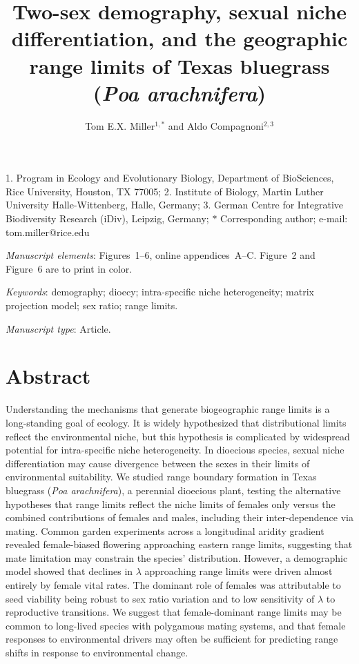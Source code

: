 \documentclass[11pt]{article}\usepackage[]{graphicx}\usepackage[]{color}
\title{Two-sex demography, sexual niche differentiation, and the geographic range limits of Texas bluegrass (\textit{Poa arachnifera})}
\author{Tom E.X. Miller$^{1,\ast}$ and Aldo Compagnoni$^{2,3}$}
\date{}
\begin{document}
\maketitle
\noindent{} 1. Program in Ecology and Evolutionary Biology, Department of BioSciences, Rice University, Houston, TX 77005;
\noindent{} 2. Institute of Biology, Martin Luther University Halle-Wittenberg, Halle, Germany;
\noindent{} 3. German Centre for Integrative Biodiversity Research (iDiv), Leipzig, Germany;
\noindent{} $\ast$ Corresponding author; e-mail: tom.miller@rice.edu

\bigskip

\textit{Manuscript elements}: Figures~1--6, online appendices~A--C. Figure~2 and Figure~6 are to print in color.

\bigskip

\textit{Keywords}: demography; dioecy; intra-specific niche heterogeneity; matrix projection model; sex ratio; range limits.

\bigskip

\textit{Manuscript type}: Article. %

\bigskip



\newpage{}

\section*{Abstract}
\linenumbers
Understanding the mechanisms that generate biogeographic range limits is a long-standing goal of ecology. 
It is widely hypothesized that distributional limits reflect the environmental niche, but this hypothesis is complicated by widespread potential for intra-specific niche heterogeneity. 
In dioecious species, sexual niche differentiation may cause divergence between the sexes in their limits of environmental suitability. 
We studied range boundary formation in Texas bluegrass (\textit{Poa arachnifera}), a perennial dioecious plant, testing the alternative hypotheses that range limits reflect the niche limits of females only versus the combined contributions of females and males, including their inter-dependence via mating. 
Common garden experiments across a longitudinal aridity gradient revealed female-biased flowering approaching eastern range limits, suggesting that mate limitation may constrain the species' distribution. 
However, a demographic model showed that declines in $\lambda$ approaching range limits were driven almost entirely by female vital rates. 
The dominant role of females was attributable to seed viability being robust to sex ratio variation and to low sensitivity of $\lambda$ to reproductive transitions.
We suggest that female-dominant range limits may be common to long-lived species with polygamous mating systems, and that female responses to environmental drivers may often be sufficient for predicting range shifts in response to environmental change.
\end{document}

